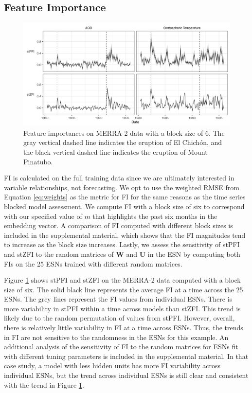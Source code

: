 \documentclass[AMS,STIX2COL]{WileyNJD-v2}
\begin{document}
\subsection{Feature Importance}

\begin{figure}[ht!]
    \centering
    \includegraphics[width=\textwidth]{figures/merra2_fi.png}
    \caption{Feature importances on MERRA-2 data with a block size of 6. The gray vertical dashed line indicates the eruption of El Chichón, and the black vertical dashed line indicates the eruption of Mount Pinatubo.}
    \label{fig:merra2fi}
\end{figure}

FI is calculated on the full training data since we are ultimately interested in variable relationships, not forecasting. We opt to use the weighted RMSE from Equation \ref{eq:weights} as the metric for FI for the same reasons as the time series blocked model assessment. We compute FI with a block size of six to correspond with our specified value of $m$ that highlights the past six months in the embedding vector. A comparison of FI computed with different block sizes is included in the supplemental material, which shows that the FI magnitudes tend to increase as the block size increases. Lastly, we assess the sensitivity of stPFI and stZFI to the random matrices of \textbf{W} and \textbf{U} in the ESN by computing both FIs on the 25 ESNs trained with different random matrices.

Figure \ref{fig:merra2fi} shows stPFI and stZFI on the MERRA-2 data computed with a block size of six. The solid black line represents the average FI at a time across the 25 ESNs. The grey lines represent the FI values from individual ESNs. There is more variability in stPFI within a time across models than stZFI. This trend is likely due to the random permutation of values from stPFI. However, overall, there is relatively little variability in FI at a time across ESNs. Thus, the trends in FI are not sensitive to the randomness in the ESNs for this example. An additional analysis of the sensitivity of FI to the random matrices for ESNs fit with different tuning parameters is included in the supplemental material. In that case study, a model with less hidden units has more FI variability across individual ESNs, but the trend across individual ESNs is still clear and consistent with the trend in Figure \ref{fig:merra2fi}.
\end{document}
